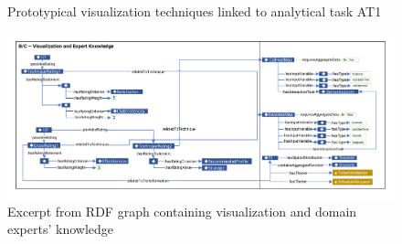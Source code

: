\documentclass[]{interact}
\theoremstyle{plain}%
\theoremstyle{definition}
\theoremstyle{remark}
\theoremstyle{definition}
\begin{document}
\begin{figure}
\centering
{}
\\
\caption{Prototypical visualization techniques linked to analytical task AT1}
\label{fig:visualizations}
\end{figure}

\begin{figure}
\centering
\includegraphics[width=\textwidth]{images/vis_user.pdf}
\caption{Excerpt from RDF graph containing visualization and domain experts' knowledge}
\label{fig:vis_user}
\end{figure}
\end{document}
